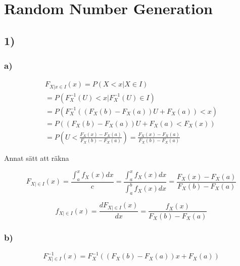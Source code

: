 \documentclass[a4paper]{article}
\begin{document}
 
\section*{Random Number Generation}

\subsection*{1)}

\subsubsection*{a)}

\begin{equation}
     \begin{gathered}
        F_{X|x\in{I}}(x) = P(X < x | X \in I) \\
        = P(F_X^{-1}(U) < x | F_X^{-1}(U) \in I) \\
        = P(F_X^{-1}((F_X(b)-F_X(a))U+F_X(a)) < x) \\
        = P((F_X(b)-F_X(a))U + F_X(a) < F_X(x)) \\
        = P(U < \frac{F_X(x)-F_X(a)}{F_X(b)-F_X(a)})
        = \frac{F_X(x)-F_X(a)}{F_X(b)-F_X(a)}
     \end{gathered}
\end{equation}

Annat sätt att räkna

\begin{equation}
    F_{X|\in{I}}(x) = \frac{\int_a^xf_X(x)dx}{c} = \frac{\int_a^xf_X(x)dx}{\int_a^bf_X(x)dx} = \frac{F_X(x)-F_X(a)}{F_X(b)-F_X(a)}
\end{equation}

\begin{equation}
    f_{X|\in{I}}(x) = \frac{dF_{X|\in{I}}(x)}{dx} = \frac{f_X(x)}{F_X(b)-F_X(a)}
\end{equation}

\subsubsection*{b)}

\begin{equation}
    F_{X|\in{I}}^{-1}(x) = F_X^{-1}((F_X(b)- F_X(a))x + F_X(a))
\end{equation}
\end{document}
